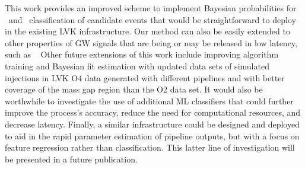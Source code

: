 This work provides an improved scheme to implement Bayesian probabilities for \hasns\ and \hasrem\ classification of candidate events that would be straightforward to deploy in the existing LVK
infrastructure. Our method can also be easily extended to other properties of
\ac{GW} signals that are being or may be released in low latency, such as
\hasgap\  Other future extensions of this work include improving algorithm training and Bayesian fit estimation with updated data
sets of simulated injections in \ac{LVK} \ac{O4} data generated with different pipelines and with better coverage of the mass gap region than the \ac{O2} data set. It would also be worthwhile to
investigate the use of additional ML classifiers that could further improve the process's accuracy, reduce the need for computational resources, and decrease latency. Finally, a similar
infrastructure could be designed and deployed to aid in the rapid parameter estimation of pipeline outputs, but with a focus on feature regression rather than classification. This latter line of
investigation will be presented in a future publication.




